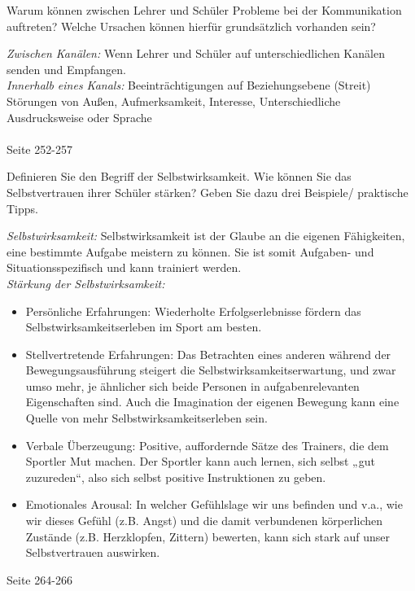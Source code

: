 \begin{question}{5}
Warum können zwischen Lehrer und Schüler Probleme bei der Kommunikation auftreten? Welche Ursachen können hierfür grundsätzlich vorhanden sein?
\end{question}
\begin{solution}
\emph{Zwischen Kanälen:} Wenn Lehrer und Schüler auf unterschiedlichen Kanälen senden und Empfangen.\\
\emph{Innerhalb eines Kanals:} Beeinträchtigungen auf Beziehungsebene (Streit)\\
Störungen von Außen, Aufmerksamkeit, Interesse, Unterschiedliche Ausdrucksweise oder Sprache\\\\
 Seite 252-257
\end{solution}

\begin{question}{4}
Definieren Sie den Begriff der Selbstwirksamkeit. Wie können Sie das Selbstvertrauen ihrer Schüler stärken? Geben Sie dazu drei Beispiele/ praktische Tipps.
\end{question}
\begin{solution}
\emph{Selbstwirksamkeit:} Selbstwirksamkeit ist der Glaube an die eigenen Fähigkeiten, eine bestimmte Aufgabe meistern zu können. Sie ist somit Aufgaben- und Situationsspezifisch und kann trainiert werden.\\
\emph{Stärkung der Selbstwirksamkeit:} 
\begin{itemize}
\item Persönliche Erfahrungen: Wiederholte Erfolgserlebnisse fördern das Selbstwirksamkeitserleben im Sport am besten.
\item Stellvertretende Erfahrungen: Das Betrachten eines anderen während der Bewegungsausführung steigert die Selbstwirksamkeitserwartung, und zwar umso mehr, je ähnlicher sich beide Personen in aufgabenrelevanten Eigenschaften sind. Auch die Imagination der eigenen Bewegung kann eine Quelle von mehr Selbstwirksamkeitserleben sein.
\item Verbale Überzeugung: Positive, auffordernde Sätze des Trainers, die dem Sportler Mut machen. Der Sportler kann auch lernen, sich selbst „gut zuzureden“, also sich selbst positive Instruktionen zu geben.
\item Emotionales Arousal: In welcher Gefühlslage wir uns befinden und v.a., wie wir dieses Gefühl (z.B. Angst) und die damit verbundenen körperlichen Zustände (z.B. Herzklopfen, Zittern) bewerten, kann sich stark auf unser Selbstvertrauen auswirken.
\end{itemize}
 Seite 264-266
\end{solution}

